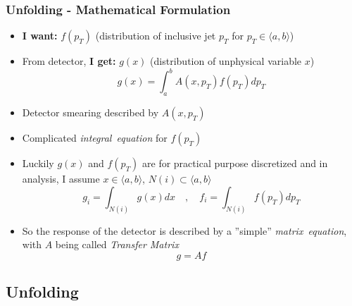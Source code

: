 \documentclass[compress]{beamer}
\newcommand{\pt}{p_{T}}
\begin{document}
\begin{frame}
\frametitle{Unfolding - Mathematical Formulation}
\begin{itemize}
   \item \textbf{I want:} $f(\pt)$ (distribution of inclusive jet $\pt$ for $\pt \in
    \langle a, b \rangle$)
  \item From detector, \textbf{I get:} $g(x)$ (distribution of unphysical variable
    $x$)
  \begin{equation*}
    g(x) = \int_a^b A(x,\pt) f(\pt) d\pt
  \end{equation*}
  \item Detector smearing described by $A(x,\pt)$
  \item Complicated \textit{\color{red}integral~equation} for $f(\pt)$
   \item Luckily $g(x)$ and $f(\pt)$ are for practical purpose discretized and in
    analysis, I assume $x \in \langle a, b \rangle$, $N(i) \subset \langle
    a , b \rangle$ 
  \begin{equation*}
    g_i = \int_{N(i)}g(x)dx \quad , \quad f_i = \int_{N(i)}f(\pt)d\pt
  \end{equation*}
  \item So the response of the detector is described by a ''simple''
    \textit{\color{red}matrix~equation}, with $A$ being called
    \textit{\color{red}Transfer Matrix} 
  \begin{equation*}
    g = A f
  \end{equation*}
\end{itemize}
\end{frame}


\subsection{Unfolding}
\end{document}
